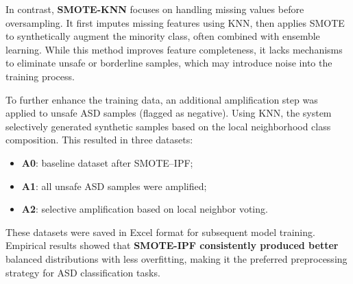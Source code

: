 \documentclass[conference]{IEEEtran}
\begin{document}
In contrast, \textbf{SMOTE-KNN} focuses on handling missing values before oversampling. It first imputes missing features using KNN, then applies SMOTE to synthetically augment the minority class, often combined with ensemble learning. While this method improves feature completeness, it lacks mechanisms to eliminate unsafe or borderline samples, which may introduce noise into the training process.

To further enhance the training data, an additional amplification step was applied to unsafe ASD samples (flagged as negative). Using KNN, the system selectively generated synthetic samples based on the local neighborhood class composition. This resulted in three datasets:
\begin{itemize}
    \item \textbf{A0}: baseline dataset after SMOTE–IPF;
    \item \textbf{A1}: all unsafe ASD samples were amplified;
    \item \textbf{A2}: selective amplification based on local neighbor voting.
\end{itemize}

These datasets were saved in Excel format for subsequent model training. Empirical results showed that \textbf{SMOTE-IPF consistently produced better} balanced distributions with less overfitting, making it the preferred preprocessing strategy for ASD classification tasks.
\end{document}
